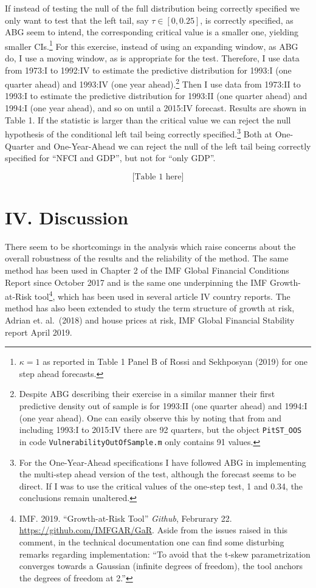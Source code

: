 \documentclass[11pt,]{article}
\let\rmarkdownfootnote\footnote%
\def\footnote{\protect\rmarkdownfootnote}
\begin{document}
If instead of testing the null of the full distribution being correctly
specified we only want to test that the left tail, say
\(\tau \in [0, 0.25]\), is correctly specified, as ABG seem to intend,
the corresponding critical value is a smaller one, yielding smaller
CIs.\footnote{$\kappa = 1$  as reported in Table 1 Panel B of Rossi and Sekhposyan (2019) for one step ahead forecasts.}
For this exercise, instead of using an expanding window, as ABG do, I
use a moving window, as is appropriate for the test. Therefore, I use
data from 1973:I to 1992:IV to estimate the predictive distribution for
1993:I (one quarter ahead) and 1993:IV (one year
ahead).\footnote{Despite ABG describing their exercise in a similar manner their first predictive density out of sample is for 1993:II (one quarter ahead) and 1994:I (one year ahead). One can easily observe this by noting that from and including 1993:I to 2015:IV there are 92 quarters, but the object \texttt{PitST\_OOS} in code \texttt{VulnerabilityOutOfSample.m} only contains 91 values.}
Then I use data from 1973:II to 1993:I to estimate the predictive
distribution for 1993:II (one quarter ahead) and 1994:I (one year
ahead), and so on until a 2015:IV forecast. Results are shown in Table
1. If the statistic is larger than the critical value we can reject the
null hypothesis of the conditional left tail being correctly
specified.\footnote{For the One-Year-Ahead specifications I have followed ABG in implementing the multi-step ahead version of the test, although the forecast seems to be direct. If I was to use the critical values of the one-step test, 1 and 0.34, the conclusions remain unaltered.}
Both at One-Quarter and One-Year-Ahead we can reject the null of the
left tail being correctly specified for ``NFCI and GDP'', but not for
``only GDP''.

\[
\text{[Table 1 here]}
\]

\hypertarget{iv.-discussion}{%
\section{IV. Discussion}\label{iv.-discussion}}

There seem to be shortcomings in the analysis which raise concerns about
the overall robustness of the results and the reliability of the method.
The same method has been used in Chapter 2 of the IMF Global Financial
Conditions Report since October 2017 and is the same one underpinning
the IMF Growth-at-Risk
tool\footnote{IMF. 2019. “Growth-at-Risk Tool” \textit{Github}, Februrary 22. \url{https://github.com/IMFGAR/GaR}. Aside from the issues raised in this comment, in the technical documentation one can find some disturbing remarks regarding implementation: “To avoid that the t-skew parametrization converges towards a Gaussian (infinite degrees of freedom), the tool anchors the degrees of freedom at 2.”},
which has been used in several article IV country reports. The method
has also been extended to study the term structure of growth at risk,
Adrian et. al.~(2018) and house prices at risk, IMF Global Financial
Stability report April 2019.
\end{document}
